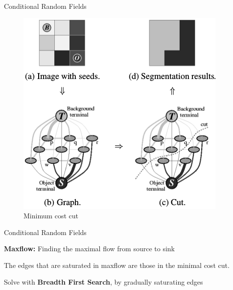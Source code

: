 \documentclass[10pt]{beamer}
\begin{document}
\begin{frame}[fragile]{Conditional Random Fields}
  
  \begin{figure}[h!]
    \centering
    \includegraphics[scale=0.49]{pictures/graphCuts2}
    \caption{Minimum cost cut}
    \label{fig:minCut}
  \end{figure}

  
\end{frame}


\begin{frame}[fragile]{Conditional Random Fields}

  \textbf{Maxflow:} Finding the maximal flow from source to sink

  The edges that are saturated in maxflow are those in the minimal cost cut.

  \pause
  Solve with \textbf{Breadth First Search}, by gradually saturating edges
  
\end{frame}
\end{document}

